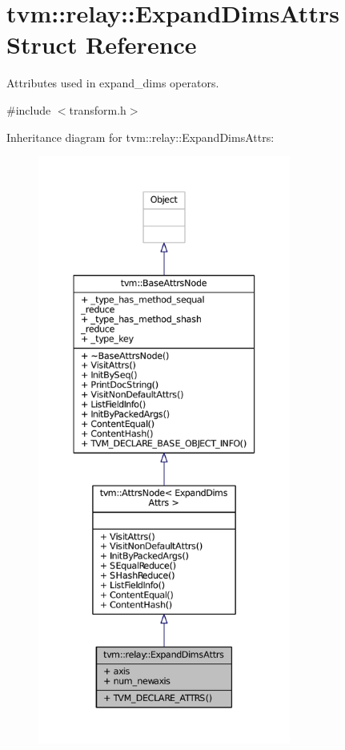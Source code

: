 \hypertarget{structtvm_1_1relay_1_1ExpandDimsAttrs}{}\section{tvm\+:\+:relay\+:\+:Expand\+Dims\+Attrs Struct Reference}
\label{structtvm_1_1relay_1_1ExpandDimsAttrs}


Attributes used in expand\+\_\+dims operators.  




{\ttfamily \#include $<$transform.\+h$>$}



Inheritance diagram for tvm\+:\+:relay\+:\+:Expand\+Dims\+Attrs\+:
\nopagebreak
\begin{figure}[H]
\begin{center}
\leavevmode
\includegraphics[height=550pt]{structtvm_1_1relay_1_1ExpandDimsAttrs__inherit__graph}
\end{center}
\end{figure}


